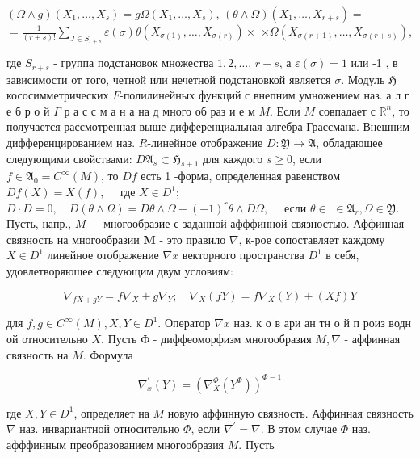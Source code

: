 \documentclass[10pt]{article}
\begin{document}
$(\Omega \wedge g)\left(X_{1}, \ldots, X_{s}\right)=g \Omega\left(X_{1}, \ldots, X_{s}\right)$, $(\theta \wedge \Omega)\left(X_{1}, \ldots, X_{r+s}\right)=$ $=\frac{1}{(r+s) !} \sum_{J \in S_{r+s}} \varepsilon(\sigma) \theta\left(X_{\sigma(1)}, \ldots, X_{\sigma(r)}\right) \times$ $\times \Omega\left(X_{\sigma(r+1)}, \ldots, X_{\sigma(r+s)}\right)$,



где $S_{r+s}$ - группа подстановок множества $1,2, \ldots$, $r+s$, а $\varepsilon(\sigma)=1$ или -1 , в зависимости от того, четной или нечетной подстановкой является $\sigma$. Модуль $\mathfrak{H}$ кососимметрических $F$-полилинейных функций с внепним умножением наз. а л г е б р о й $\Gamma$ р а с с м а н а на д много об раз и е м $M$. Если $M$ совпадает с $\mathbb{R}^{n}$, то получается рассмотренная выше дифференциальная алгебра Грассмана. Внешним дифференцированием наз. $R$-линейное отображение $D: \mathfrak{Y} \rightarrow \mathfrak{A}$, обладающее следующими свойствами: $D \mathfrak{A}_{s} \subset \mathfrak{H}_{s+1}$ для каждого $s \geqslant 0$, если $f \in \mathfrak{A}_{0}=C^{\infty}(M)$, то $D f$ есть 1 -форма, определенная равенством $D f(X)=X(f), \quad$ где $X \in D^{1}$; $D \cdot D=0, \quad D(\theta \wedge \Omega)=D \theta \wedge \Omega+(-1)^{r} \theta \wedge D \Omega, \quad$ если $\theta \in$ $\in \mathfrak{A}_{r}, \Omega \in \mathfrak{Y}$. Пусть, напр., $M-$ многообразие с заданной афффинной связностью. Аффинная связность на многообразии $\boldsymbol{M}$ - это правило $\nabla$, к-рое сопоставляет каждому $X \in D^{1}$ линейное отображение $\nabla x$ векторного пространства $D^{1}$ в себя, удовлетворяющее следующим двум условиям:



\[

\nabla_{f X+g Y}=f \nabla_{X}+g \nabla_{Y} ; \quad \nabla_{X}(f Y)=f \nabla_{X}(Y)+(X f) Y

\]



для $f, g \in C^{\infty}(M), X, Y \in D^{1}$. Оператор $\nabla x$ наз. к о в ари ан тн о й п роиз водн ой относительно $X$. Пусть Ф - диффеоморфизм многообразия $M, \nabla$ - аффинная связность на $M$. Формула



\[

\nabla_{x}^{\prime}(Y)=\left(\nabla_{X}^{\Phi}\left(Y^{\Phi}\right)\right)^{\Phi-1}

\]



где $X, Y \in D^{1}$, определяет на $M$ новую аффинную связность. Аффинная связность $\nabla$ наз. инвариантной относительно $\Phi$, если $\nabla^{\prime}=\nabla$. В этом случае $\Phi$ наз. афффинным преобразованием многообразия $M$. Пусть
\end{document}
